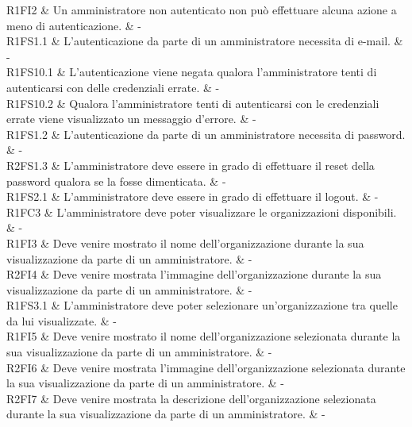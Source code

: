 R1FI2 & Un amministratore non autenticato non può effettuare alcuna azione a meno di autenticazione.  & - \\

R1FS1.1 & L’autenticazione da parte di un amministratore necessita di e-mail. & - \\

R1FS10.1 & L’autenticazione viene negata qualora l'amministratore tenti di autenticarsi con delle credenziali errate.  & - \\

R1FS10.2 & Qualora l'amministratore tenti di autenticarsi con le credenziali errate viene visualizzato un messaggio d’errore.  & - \\

R1FS1.2 & L’autenticazione da parte di un amministratore necessita di password. & - \\

R2FS1.3 & L'amministratore deve essere in grado di effettuare il reset della password qualora se la fosse dimenticata. & - \\

R1FS2.1 & L'amministratore deve essere in grado di effettuare il logout. & - \\

R1FC3 & L'amministratore deve poter visualizzare le organizzazioni disponibili. & - \\

R1FI3 & Deve venire mostrato il nome dell'organizzazione durante la sua visualizzazione da parte di un amministratore.  & - \\

R2FI4 & Deve venire mostrata l'immagine dell'organizzazione durante la sua visualizzazione da parte di un amministratore.  & - \\

R1FS3.1 & L'amministratore deve poter selezionare un'organizzazione tra quelle da lui visualizzate.  & - \\

R1FI5 & Deve venire mostrato il nome dell'organizzazione selezionata durante la sua visualizzazione da parte di un amministratore. & - \\

R2FI6 & Deve venire mostrata l'immagine dell'organizzazione selezionata durante la sua visualizzazione da parte di un amministratore.  & - \\

R2FI7 & Deve venire mostrata la descrizione dell'organizzazione selezionata durante la sua visualizzazione da parte di un amministratore. & - \\

